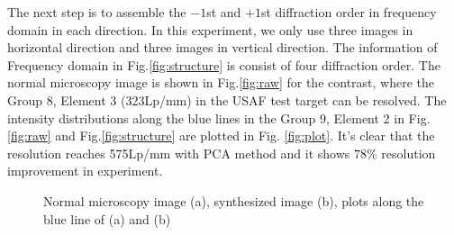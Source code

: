 \documentclass[letterpaper,10pt]{article}
\begin{document}
The next step is to assemble the $-1$st and $+1$st diffraction order in frequency domain in each direction.
In this experiment, we only use three images in horizontal direction and three images in vertical direction.
The information of Frequency domain in Fig.\ref{fig:structure} is consist of four diffraction order.
The normal microscopy image is shown in Fig.\ref{fig:raw} for the contrast, where the Group 8, Element 3 (323Lp/mm) in the USAF test target can be resolved.
The intensity distributions along the blue lines in the Group 9, Element 2 in Fig.\ref{fig:raw} and Fig.\ref{fig:structure} are plotted in Fig. \ref{fig:plot}.
It's clear that the resolution reaches 575Lp/mm with PCA method and it shows $78\%$ resolution improvement in experiment.

\begin{figure}[h]
    \centering
    \centering
    \caption{Normal microscopy image (a), synthesized image (b), plots along the blue line of (a) and (b)}
\end{figure}
\end{document}
